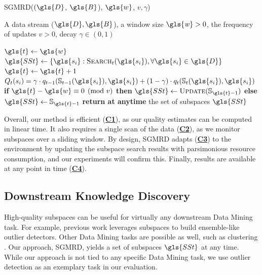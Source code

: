 \begin{algorithm}
		\footnotesize
	\caption{\textsc{\gls{SGMRD}}($(\gls{D}$, $\gls{B}$), $\gls{w}$, $v, \gamma$)}\label{alg:sgmrd} 
	\begin{algorithmic}[1]
		\Require A data stream ($\gls{D},\gls{B}$), a window size $\mathit{\gls{w}} > 0$, the frequency of updates $v > 0$, decay $\gamma \in (0,1)$
		
		\State $\gls{t} \gets \gls{w}$ 
		\State $\gls{SSt} \gets \{\gls{s_i} : \textsc{Search}_t(\gls{s_i}), \forall \gls{s_i} \in \gls{D}\}$ \label{line:initialsearch}  
		   
		\State $\gls{t} \gets \gls{t} + 1$
		 \label{line:monitor} 
		\State $Q_{t}({s_i}) = \gamma \cdot q_{t-1}(\mathbb{S}_{t-1}(\gls{s_i}), \gls{s_i}) + (1- \gamma) \cdot {q}_{{t}}(\mathbb{S}_t(\gls{s_i}), \gls{s_i})$  
		\EndFor
		\State \textbf{if} $\gls{t} - \gls{w} \equiv 0 \pmod{v}$ \textbf{then} $\gls{SSt} \gets \textsc{Update}(\mathbb{S}_{{\gls{t}}-1})$ \textbf{else} $\gls{SSt} \gets \mathbb{S}_{{\gls{t}}-1}$ \label{line:update} 
		\EndWhile	
		\State \textbf{return at anytime} the set of subspaces $\gls{SSt}$ 
	\end{algorithmic}
\end{algorithm}

Overall, our method is efficient (\hyperlink{C1}{\textbf{C1}}), as our quality estimates can be computed in linear time. %
It also requires a single scan of the data (\hyperlink{C2}{\textbf{C2}}), as we monitor subspaces over a sliding window. By design, \gls{SGMRD} adapts (\hyperlink{C3}{\textbf{C3}}) to the environment by updating the subspace search results with parsimonious resource consumption, and our experiments will confirm this. Finally, results are available at any point in time (\hyperlink{C4}{\textbf{C4}}). 

\subsection{Downstream Knowledge Discovery}
\label{sec:downstream}

High-quality subspaces can be useful for virtually any downstream Data Mining task. For example, previous work \cite{DBLP:conf/icde/KellerMB12,  DBLP:conf/sdm/NguyenMV16, DBLP:conf/aaai/WangRNBMX17, DBLP:journals/ijdsa/TrittenbachB19} leverages subspaces to build ensemble-like outlier detectors. Other Data Mining tasks are possible as well, such as clustering \cite{ DBLP:conf/cikm/ParkL07, DBLP:conf/icdm/ZhangLW07, DBLP:journals/datamine/AgrawalGGR05, DBLP:conf/icde/Aggarwal09a, DBLP:conf/ideas/KontakiPM06}. Our approach, \gls{SGMRD}, yields a set of subspaces $\gls{SSt}$ at any time. While our approach is not tied to any specific Data Mining task, we use outlier detection as an exemplary task in our evaluation. 

